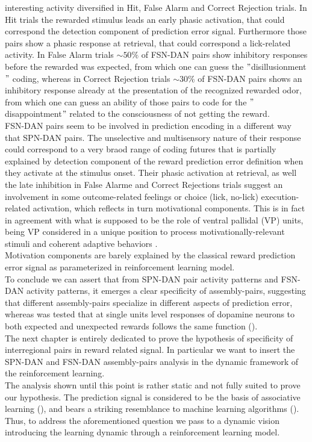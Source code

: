 interesting activity diversified in Hit, False Alarm and Correct Rejection trials. In Hit trials the rewarded stimulus leads an early phasic activation, that could correspond the detection component of prediction error signal. Furthermore those pairs show a phasic response at retrieval, that could correspond a lick-related activity. In False Alarm trials $\sim 50\%$ of FSN-DAN pairs show inhibitory responses before the rewarded was expected, from which one can guess the $"$disillusionment$"$ coding, whereas in Correct Rejection trials $\sim 30\%$ of FSN-DAN pairs shows an inhibitory response already at the presentation of the recognized rewarded odor, from which one can guess an ability of those pairs to code for the $"$disappointment$"$ related to the consciousness of not getting the reward.\\FSN-DAN pairs seem to be involved in prediction encoding in a different way that SPN-DAN pairs. The unselective and multisensory nature of their response could correspond to a very braod range of coding futures that is partially explained by detection component of the reward prediction error definition when they activate at the stimulus onset. Their phasic activation at retrieval, as well the late inhibition in False Alarme and Correct Rejections trials suggest an involvement in some outcome-related feelings or choice (lick, no-lick) execution-related activation, which reflects in turn motivational components. This is in fact in agreement with what is supposed to be the role of ventral pallidal (VP) units, being VP considered in a unique position to process motivationally-relevant stimuli and coherent adaptive behaviors \cite{Root}.\\ Motivation components are barely explained by the classical reward prediction error signal as parameterized in reinforcement learning model.\\To conclude we can assert that from SPN-DAN pair activity patterns and FSN-DAN activity patterns, it emerges a clear specificity of assembly-pairs, suggesting that different assembly-pairs specialize in different aspects of prediction error, whereas was tested that at single units level responses of dopamine neurons to both expected and unexpected rewards follows the same function (\cite{UchidaDop}).\\The next chapter is entirely dedicated to prove the hypothesis of specificity of interregional pairs in reward related signal. In particular we want to insert the SPN-DAN and FSN-DAN assembly-pairs analysis in the dynamic framework of the reinforcement learning.\\The analysis shown until this point is rather static and not fully suited to prove our hypothesis. The prediction signal is considered to be the basis of associative learning (\cite{RescorlaWagner}), and bears a striking resemblance to machine learning algorithms (\cite{SuttonBarto}). Thus, to address the aforementioned question we pass to a dynamic vision introducing the learning dynamic through a reinforcement learning model.

